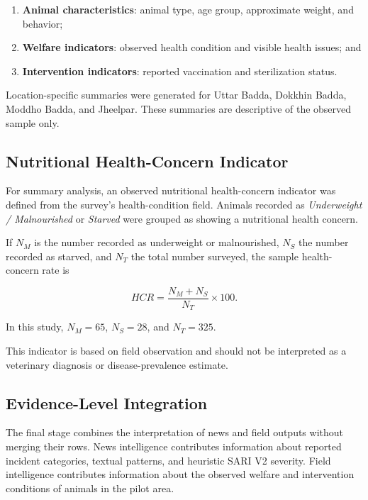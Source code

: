 \documentclass[conference]{IEEEtran}
\begin{document}
\begin{enumerate}
    \item \textbf{Animal characteristics}: animal type, age group,
    approximate weight, and behavior;

    \item \textbf{Welfare indicators}: observed health condition and visible
    health issues; and

    \item \textbf{Intervention indicators}: reported vaccination and
    sterilization status.
\end{enumerate}

Location-specific summaries were generated for Uttar Badda, Dokkhin Badda,
Moddho Badda, and Jheelpar. These summaries are descriptive of the observed
sample only.

\subsection{Nutritional Health-Concern Indicator}

For summary analysis, an observed nutritional health-concern indicator was
defined from the survey's health-condition field. Animals recorded as
\textit{Underweight / Malnourished} or \textit{Starved} were grouped as
showing a nutritional health concern.

If $N_M$ is the number recorded as underweight or malnourished, $N_S$ the
number recorded as starved, and $N_T$ the total number surveyed, the sample
health-concern rate is

\begin{equation}
HCR =
\frac{N_M+N_S}{N_T}\times100.
\end{equation}

In this study, $N_M=65$, $N_S=28$, and $N_T=325$.

This indicator is based on field observation and should not be interpreted as
a veterinary diagnosis or disease-prevalence estimate.

\subsection{Evidence-Level Integration}

The final stage combines the interpretation of news and field outputs without
merging their rows. News intelligence contributes information about reported
incident categories, textual patterns, and heuristic SARI V2 severity.
Field intelligence contributes information about the observed welfare and
intervention conditions of animals in the pilot area.
\end{document}
